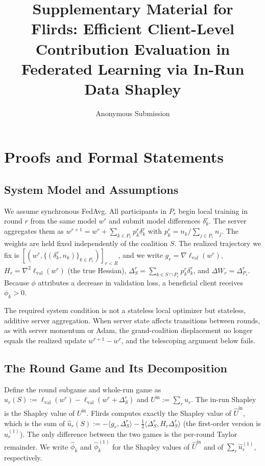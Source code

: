 \documentclass[letterpaper]{article} %
\title{Supplementary Material for\\Flirds: Efficient Client-Level Contribution Evaluation in Federated Learning via In-Run Data Shapley}
\author{
    Anonymous Submission
}
\theoremstyle{plain}
\newcommand{\lval}{\ell_{\mathrm{val}}}
\begin{document}
\maketitle
\appendix

\section{Proofs and Formal Statements}
\label{app:proofs}

\subsection{System Model and Assumptions}
\label{app:model}

We assume synchronous FedAvg. All participants in $P_r$ begin local training
in round $r$ from the same model $w^r$ and submit model differences
$\delta_k^r$. The server aggregates them as
$w^{r+1} = w^r + \sum_{k \in P_r} p_k^r \delta_k^r$ with
$p_k^r = n_k / \sum_{j \in P_r} n_j$. The weights are held fixed
independently of the coalition $S$. The realized trajectory we fix is
$[(w^r, \{(\delta_k^r, n_k)\}_{k \in P_r})]_{r<R}$, and we write
$g_r = \nabla\lval(w^r)$, $H_r = \nabla^2\lval(w^r)$ (the true Hessian),
$\Delta_S^r = \sum_{k \in S \cap P_r} p_k^r \delta_k^r$, and
$\Delta W_r = \Delta_{P_r}^r$. Because $\phi$ attributes a decrease in
validation loss, a beneficial client receives $\phi_k > 0$.

The required system condition is not a stateless local optimizer but
stateless, additive server aggregation. When server state affects transitions
between rounds, as with server momentum or Adam, the grand-coalition
displacement no longer equals the realized update $w^{r+1} - w^r$, and the
telescoping argument below fails.

\subsection{The Round Game and Its Decomposition}
\label{app:game}

Define the round subgame and whole-run game as
$u_r(S) := \lval(w^r) - \lval(w^r + \Delta_S^r)$ and
$U^{\mathrm{in}} := \sum_r u_r$. The in-run Shapley is the Shapley value of
$U^{\mathrm{in}}$. Flirds computes exactly the Shapley value of
$\hat U^{\mathrm{in}}$, which is the sum of
$\hat u_r(S) := -\langle g_r, \Delta_S^r\rangle
- \tfrac12\langle \Delta_S^r, H_r \Delta_S^r\rangle$
(the first-order version is $\hat u_r^{(1)}$). The only difference between
the two games is the per-round Taylor remainder. We write $\hat\phi_k$ and
$\hat\phi_k^{(1)}$ for the Shapley values of $\hat U^{\mathrm{in}}$ and of
$\sum_r \hat u_r^{(1)}$, respectively.
\end{document}
